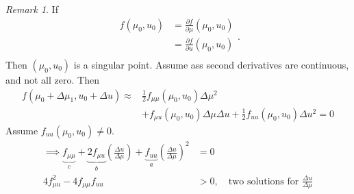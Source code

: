 \documentclass{article}
\theoremstyle{remark}
\newtheorem*{remark}{Remark}
\begin{document}
 
\begin{remark}
  If \[
  \begin{split}
    f\left( \mu _{0}, u_{0} \right) &=  \frac{\partial f}{\partial \mu } \left( \mu _{0}, u_{0} \right) \\
    &=  \frac{\partial f}{\partial u}  \left( \mu _{0}, u_{0} \right) \\
  \end{split} .
  \] 
  Then $\left( \mu _{0}, u_{0} \right)$ is a singular point. Assume ass second derivatives are continuous, and not all zero. Then \[
    \begin{split}
  f\left( \mu _{0} + \Delta \mu _{1}, u_{0} + \Delta  u \right) \approx  &  \frac{1}{2} f_{\mu \mu } \left( \mu _{0}, u_{0} \right) \Delta \mu ^2 \\
   & + f_{\mu u } \left( \mu _{0}, u_{0} \right) \Delta \mu  \Delta u + \frac{1}{2} f_{uu} \left( \mu _{0} ,u_{0} \right) \Delta u^2 = 0
    \end{split} 
  \] 
  Assume $f_{uu}\left( \mu _{0} , u_{0} \right) \neq 0$. \[
    \begin{split}
  \implies  \underbrace{f_{\mu \mu }}_{c}  + \underbrace{2 f_{\mu u}}_{b}  \left( \frac{\Delta u}{\Delta \mu }  \right) + \underbrace{f_{uu}}_{a}  \left( \frac{\Delta u}{\Delta \mu }  \right)^2 &=  0 \\
   4 f^2_{\mu u}  - 4 f_{\mu \mu }f_{uu}   &  > 0, \quad \text{two solutions for } \frac{\Delta u}{\Delta \mu }   \\
    \end{split} 
  \] 
\end{remark}
 
\end{document}
